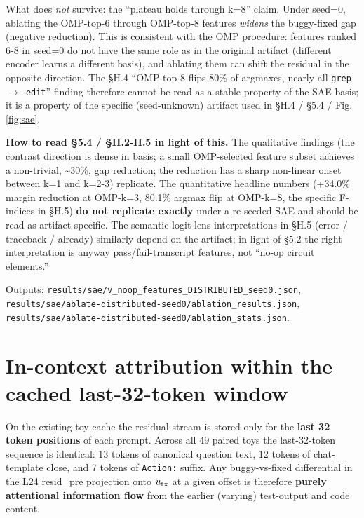 \documentclass[
  11pt,
  a4paper]{article}
\begin{document}
What does \emph{not} survive: the ``plateau holds through k=8'' claim.
Under seed=0, ablating the OMP-top-6 through OMP-top-8 features
\emph{widens} the buggy-fixed gap (negative reduction). This is
consistent with the OMP procedure: features ranked 6-8 in seed=0 do not
have the same role as in the original artifact (different encoder learns
a different basis), and ablating them can shift the residual in the
opposite direction. The \S{}H.4 ``OMP-top-8 flips 80\% of argmaxes, nearly
all \texttt{grep\ \ensuremath{\rightarrow}\ edit}'' finding therefore cannot be read as a
stable property of the SAE basis; it is a property of the specific
(seed-unknown) artifact used in \S{}H.4 / \S{}5.4 / Fig. \ref{fig:sae}.

\textbf{How to read \S{}5.4 / \S{}H.2-H.5 in light of this.} The qualitative
findings (the contrast direction is dense in basis; a small OMP-selected
feature subset achieves a non-trivial, \textasciitilde30\%, gap
reduction; the reduction has a sharp non-linear onset between k=1 and
k=2-3) replicate. The quantitative headline numbers (+34.0\% margin
reduction at OMP-k=3, 80.1\% argmax flip at OMP-k=8, the specific
F-indices in \S{}H.5) \textbf{do not replicate exactly} under a re-seeded
SAE and should be read as artifact-specific. The semantic logit-lens
interpretations in \S{}H.5 (error / traceback / already) similarly depend
on the artifact; in light of \S{}5.2 the right interpretation is anyway
pass/fail-transcript features, not ``no-op circuit elements.''

Outputs:
\texttt{results/sae/v\_noop\_features\_DISTRIBUTED\_seed0.json},
\texttt{results/}\allowbreak\texttt{sae/}\allowbreak\texttt{ablate-}\allowbreak\texttt{distributed-}\allowbreak\texttt{seed0/}\allowbreak\texttt{ablation\_results.json},
\texttt{results/}\allowbreak\texttt{sae/}\allowbreak\texttt{ablate-}\allowbreak\texttt{distributed-}\allowbreak\texttt{seed0/}\allowbreak\texttt{ablation\_stats.json}.

\section{In-context attribution within the cached last-32-token
window}\label{in-context-attribution-within-the-cached-last-32-token-window}

On the existing toy cache the residual stream is stored only for the
\textbf{last 32 token positions} of each prompt. Across all 49 paired
toys the last-32-token sequence is identical: 13 tokens of canonical
question text, 12 tokens of chat-template close, and 7 tokens of
\texttt{Action:} suffix. Any buggy-vs-fixed differential in the L24
resid\_pre projection onto \(u_{\rm tx}\) at a given offset is therefore
\textbf{purely attentional information flow} from the earlier (varying)
test-output and code content.
\end{document}
